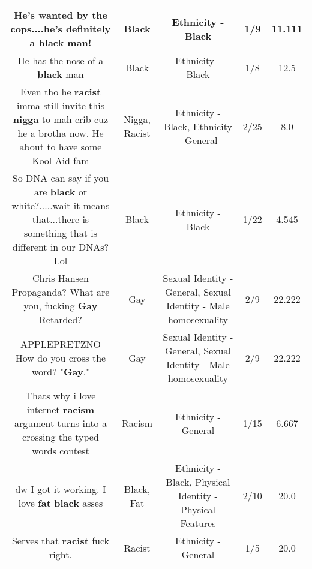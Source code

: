 \documentclass[11pt]{article}
\newlength\mylength
\begin{document}
\begin{center}
\begin{longtable}{|C{.65\mylength}|C{.30\mylength}|C{.12\mylength}|C{.12\mylength}|C{.12\mylength}|}
  \small He's wanted by the cops....he's definitely a \textbf{black} man!\normalsize   & Black & Ethnicity - Black & 1/9 & 11.111 \\  \hline
  \small He has the nose of a \textbf{black} man\normalsize   & Black & Ethnicity - Black & 1/8 & 12.5 \\  \hline
  \small Even tho he \textbf{racist} imma still invite this \textbf{nigga} to mah crib cuz he a brotha now. He about to have some Kool Aid fam\normalsize   & Nigga, Racist & Ethnicity - Black, Ethnicity - General & 2/25 & 8.0 \\  \hline
  \small So DNA can say if you are \textbf{black} or white?.....wait it means that...there is something that is different in our DNAs? Lol\normalsize   & Black & Ethnicity - Black & 1/22 & 4.545 \\  \hline
  \small Chris Hansen Propaganda? What are you, fucking \textbf{G\textbf{ay}} Retarded?\normalsize   & Gay & Sexual Identity - General, Sexual Identity - Male homosexuality & 2/9 & 22.222 \\  \hline
  \small APPLEPRETZNO   How do you cross the word? "\textbf{G\textbf{ay}}."\normalsize   & Gay & Sexual Identity - General, Sexual Identity - Male homosexuality & 2/9 & 22.222 \\  \hline
  \small Thats why i love internet \textbf{racism} argument turns into a crossing the typed words contest\normalsize   & Racism & Ethnicity - General & 1/15 & 6.667 \\  \hline
  \small dw I got it working. I love \textbf{fat} \textbf{black} asses\normalsize   & Black, Fat & Ethnicity - Black, Physical Identity - Physical Features & 2/10 & 20.0 \\  \hline
  \small Serves that \textbf{racist} fuck right.\normalsize   & Racist & Ethnicity - General & 1/5 & 20.0 \\  \hline

\end{longtable}
\end{center}
\end{document}
